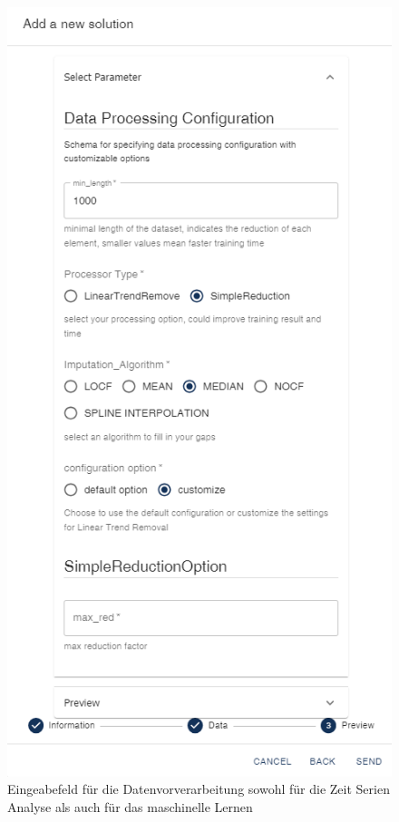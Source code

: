 \begin{figure}[h]
    \centering
    \includegraphics[width=0.5\textheight]{includes/figures/new_version/data_processing.png}
    \caption{Eingeabefeld für die Datenvorverarbeitung sowohl für die Zeit Serien Analyse als auch für das maschinelle Lernen}
\label{fig:configuration_json_schema}
\end{figure}


